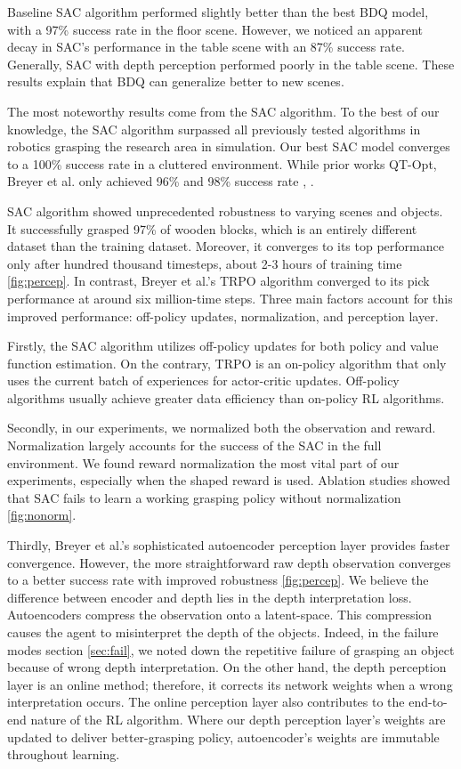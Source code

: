 Baseline SAC algorithm performed slightly better than the best BDQ model, with a 97\% success rate in the floor scene. However, we noticed an apparent decay in SAC's performance in the table scene with an 87\% success rate. Generally, SAC with depth perception performed poorly in the table scene. These results explain that BDQ can generalize better to new scenes.

The most noteworthy results come from the SAC algorithm. To the best of our knowledge, the SAC algorithm surpassed all previously tested algorithms in robotics grasping the research area in simulation. Our best SAC model converges to a 100\% success rate in a cluttered environment. While prior works QT-Opt, Breyer et al. only achieved 96\% and 98\% success rate \cite{Kalashnikov2018}, \cite{Quillen2018}. 

SAC algorithm showed unprecedented robustness to varying scenes and objects. It successfully grasped 97\% of wooden blocks, which is an entirely different dataset than the training dataset. Moreover, it converges to its top performance only after hundred thousand timesteps, about 2-3 hours of training time \ref{fig:percep}. In contrast, Breyer et al.'s TRPO algorithm converged to its pick performance at around six million-time steps. Three main factors account for this improved performance: off-policy updates, normalization, and perception layer. 

Firstly, the SAC algorithm utilizes off-policy updates for both policy and value function estimation. On the contrary, TRPO is an on-policy algorithm that only uses the current batch of experiences for actor-critic updates. Off-policy algorithms usually achieve greater data efficiency than on-policy RL algorithms.

Secondly, in our experiments, we normalized both the observation and reward. Normalization largely accounts for the success of the SAC in the full environment. We found reward normalization the most vital part of our experiments, especially when the shaped reward is used. Ablation studies showed that SAC fails to learn a working grasping policy without normalization \ref{fig:nonorm}.

Thirdly, Breyer et al.'s sophisticated autoencoder perception layer provides faster convergence. However, the more straightforward raw depth observation converges to a better success rate with improved robustness \ref{fig:percep}. We believe the difference between encoder and depth lies in the depth interpretation loss. Autoencoders compress the observation onto a latent-space. This compression causes the agent to misinterpret the depth of the objects. Indeed, in the failure modes section \ref{sec:fail}, we noted down the repetitive failure of grasping an object because of wrong depth interpretation. On the other hand, the depth perception layer is an online method; therefore, it corrects its network weights when a wrong interpretation occurs. The online perception layer also contributes to the end-to-end nature of the RL algorithm. Where our depth perception layer's weights are updated to deliver better-grasping policy, autoencoder's weights are immutable throughout learning.

